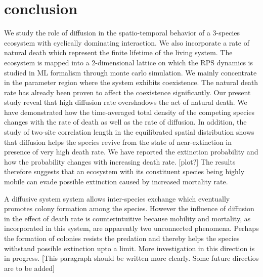 \documentclass[aps, pre, twocolumn, amsmath, superscriptaddress,showkeys,showpacs]{revtex4-1}
\begin{document}
\section{conclusion}
\label{conclusion}	
	{\color{red} We study the role of diffusion in the spatio-temporal behavior of a 3-species ecosystem with cyclically dominating interaction. We also incorporate a rate of natural death which represent the finite lifetime of the living system. The ecosystem is mapped into a 2-dimensional lattice on which the RPS dynamics is studied in ML formalism through monte carlo simulation.
We mainly concentrate in the parameter region where the system exhibits coexistence. The natural death rate has already been proven to affect the coexistence significantly. Our present study reveal that high diffusion rate overshadows the act of natural death.} 
We have demonstrated how the time-averaged total density of the competing species changes with the rate of death as well as the rate of diffusion.
{\color{red}In addition, the study of two-site correlation length in the equilibrated spatial distribution shows that diffusion helps the species revive from the state of near-extinction in presence of very high death rate.}
{\color{blue}We have reported the extinction probability and how the probability changes with increasing death rate. [plot?]}
{\color{red}The results therefore suggests that an ecosystem with its constituent species being highly mobile can evade possible extinction caused by increased mortality rate.}
\par {\color{red}A diffusive system system allows inter-species exchange which eventually promotes colony formation among the species. However the influence of diffusion in the effect of death rate is counterintuitive because mobility and mortality, as incorporated in this system, are apparently two unconnected phenomena. Perhaps the formation of colonies resists the predation and thereby helps the species withstand possible extinction upto a limit. More investigation in this direction is in progress.} {\color{blue}[This paragraph should be written more clearly. Some future directios are to be added]}\\
\end{document}
